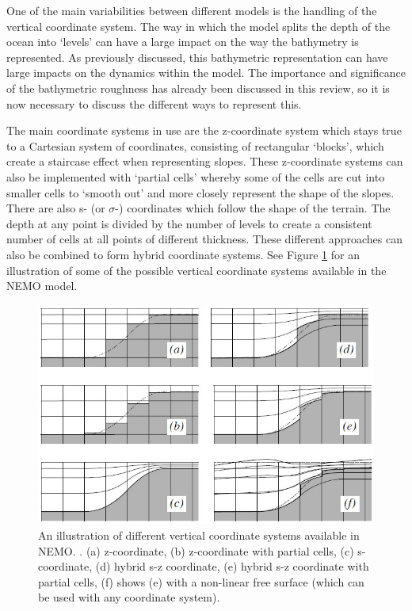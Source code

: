 \documentclass[..\report.tex]{subfiles}
\begin{document}
	One of the main variabilities between different models is the handling of the vertical coordinate system. The way in which the model splits the depth of the ocean into `levels' can have a large impact on the way the bathymetry is represented. As previously discussed, this bathymetric representation can have large impacts on the dynamics within the model. The importance and significance of the bathymetric roughness has already been discussed in this review, so it is now necessary to discuss the different ways to represent this.
    \par
The main coordinate systems in use are the z-coordinate system which stays true to a Cartesian system of coordinates, consisting of rectangular `blocks', which create a staircase effect when representing slopes. These z-coordinate systems can also be implemented with `partial cells' whereby some of the cells are cut into smaller cells to `smooth out' and more closely represent the shape of the slopes. There are also s- (or $\sigma$-) coordinates which follow the shape of the terrain. The depth at any point is divided by the number of levels to create a consistent number of cells at all points of different thickness. These different approaches can also be combined to form hybrid coordinate systems. See Figure \ref{FIG:Coords} for an illustration of some of the possible vertical coordinate systems available in the \gls{NEMO} model.

\begin{figure}[t]
  \includegraphics[width=\linewidth]{Figures/NEMOP58.jpg}
    \caption{An illustration of different vertical coordinate systems available in \gls{NEMO}. \citep{Madec2011}. (a) z-coordinate, (b) z-coordinate with partial cells, (c) s-coordinate, (d) hybrid s-z coordinate, (e) hybrid s-z coordinate with partial cells, (f) shows (e) with a non-linear free surface (which can be used with any coordinate system).}
  \label{FIG:Coords}
\end{figure}
\end{document}
